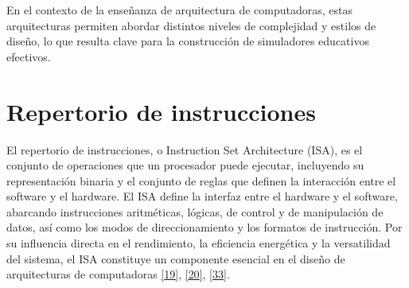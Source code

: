 \documentclass[12pt,oneside]{templates/unerthesis}
\begin{document}
\begin{table}[!h]
\centering
\caption{\label{tab:aplicacionessimulacion}Aplicaciones de la simulación en distintos sectores}
\centering
{}
\end{table}

En el contexto de la enseñanza de arquitectura de computadoras, estas arquitecturas permiten abordar distintos niveles de complejidad y estilos de diseño, lo que resulta clave para la construcción de simuladores educativos efectivos.

\hypertarget{repertorio-de-instrucciones}{%
\section{Repertorio de instrucciones}\label{repertorio-de-instrucciones}}

El repertorio de instrucciones, o Instruction Set Architecture (ISA), es el conjunto de operaciones que un procesador puede ejecutar, incluyendo su representación binaria y el conjunto de reglas que definen la interacción entre el software y el hardware. El ISA define la interfaz entre el hardware y el software, abarcando instrucciones aritméticas, lógicas, de control y de manipulación de datos, así como los modos de direccionamiento y los formatos de instrucción. Por su influencia directa en el rendimiento, la eficiencia energética y la versatilidad del sistema, el ISA constituye un componente esencial en el diseño de arquitecturas de computadoras \protect\hyperlink{ref-hennessy2017computer}{{[}19{]}}, \protect\hyperlink{ref-stallings_computer_2021}{{[}20{]}}, \protect\hyperlink{ref-null_essentials_2023}{{[}33{]}}.
\end{document}
